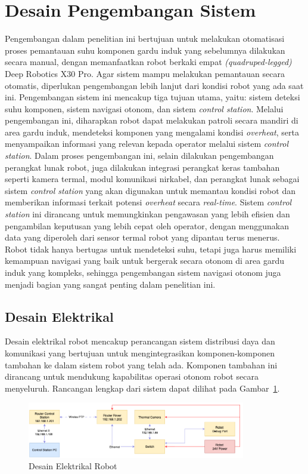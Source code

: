 \section{Desain Pengembangan Sistem}
Pengembangan dalam penelitian ini bertujuan untuk melakukan otomatisasi proses pemantauan suhu komponen gardu induk yang sebelumnya dilakukan secara manual, dengan memanfaatkan robot berkaki empat \emph{(quadruped-legged)} Deep Robotics X30 Pro. Agar sistem mampu melakukan pemantauan secara otomatis, diperlukan pengembangan lebih lanjut dari kondisi robot yang ada saat ini. Pengembangan sistem ini mencakup tiga tujuan utama, yaitu: sistem deteksi suhu komponen, sistem navigasi otonom, dan sistem \emph{control station}. Melalui pengembangan ini, diharapkan robot dapat melakukan patroli secara mandiri di area gardu induk, mendeteksi komponen yang mengalami kondisi \emph{overheat}, serta menyampaikan informasi yang relevan kepada operator melalui sistem \emph{control station}. Dalam proses pengembangan ini, selain dilakukan pengembangan perangkat lunak robot, juga dilakukan integrasi perangkat keras tambahan seperti kamera termal, modul komunikasi nirkabel, dan perangkat lunak sebagai sistem \emph{control station} yang akan digunakan untuk memantau kondisi robot dan memberikan informasi terkait potensi \emph{overheat} secara \emph{real-time}. Sistem \emph{control station} ini dirancang untuk memungkinkan pengawasan yang lebih efisien dan pengambilan keputusan yang lebih cepat oleh operator, dengan menggunakan data yang diperoleh dari sensor termal robot yang dipantau terus menerus. Robot tidak hanya bertugas untuk mendeteksi suhu, tetapi juga harus memiliki kemampuan navigasi yang baik untuk bergerak secara otonom di area gardu induk yang kompleks, sehingga pengembangan sistem navigasi otonom juga menjadi bagian yang sangat penting dalam penelitian ini. 


\subsection{Desain Elektrikal}

Desain elektrikal robot mencakup perancangan sistem distribusi daya dan komunikasi yang bertujuan untuk mengintegrasikan komponen-komponen tambahan ke dalam sistem robot yang telah ada. Komponen tambahan ini dirancang untuk mendukung kapabilitas operasi otonom robot secara menyeluruh. Rancangan lengkap dari sistem dapat dilihat pada Gambar~\ref{fig:electrical}.

\begin{figure}[H]
  \centering
  \includegraphics[width=0.85\textwidth]{gambar/bab3/electrical-design.png}
  \caption{Desain Elektrikal Robot}
  \label{fig:electrical}
\end{figure}

